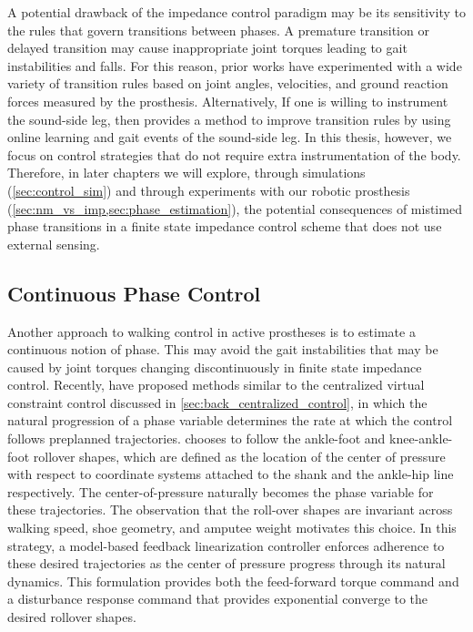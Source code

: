 A potential drawback of the impedance control paradigm may be its sensitivity to
the rules that govern transitions between phases. A premature transition or
delayed transition may cause inappropriate joint torques leading to gait
instabilities and falls. For this reason, prior works have experimented with a
wide variety of transition rules based on joint angles, velocities, and ground
reaction forces measured by the prosthesis. Alternatively, If one is willing to
instrument the sound-side leg, then \citet{liu2014improving} provides a method
to improve transition rules by using online learning and gait events of the
sound-side leg. In this thesis, however, we focus on control strategies that do
not require extra instrumentation of the body. Therefore, in later chapters we
will explore, through simulations (\cref{sec:control_sim}) and through
experiments with our robotic prosthesis
(\cref{sec:nm_vs_imp,sec:phase_estimation}), the potential consequences of
mistimed phase transitions in a finite state impedance control scheme that does
not use external sensing.

\subsection{Continuous Phase Control}
Another approach to walking control in active prostheses is to estimate a
continuous notion of phase. This may avoid the gait instabilities that may be
caused by joint torques changing discontinuously in finite state impedance
control. Recently, \citet{gregg2014virtual} have proposed
methods similar to the centralized virtual constraint control discussed in
\cref{sec:back_centralized_control}, in which the natural progression of a phase
variable determines the rate at which the control follows preplanned
trajectories. \citet{gregg2014virtual} chooses to follow the ankle-foot and
knee-ankle-foot rollover shapes, which are defined as the location of the center
of pressure with respect to coordinate systems attached to the shank and the
ankle-hip line respectively. The center-of-pressure naturally becomes the phase
variable for these trajectories. The observation that the roll-over shapes are
invariant across walking speed, shoe geometry, and amputee weight motivates this
choice. In this strategy, a model-based feedback linearization controller
enforces adherence to these desired trajectories as the center of pressure
progress through its natural dynamics. This formulation provides both the
feed-forward torque command and a disturbance response command that provides
exponential converge to the desired rollover shapes. 

